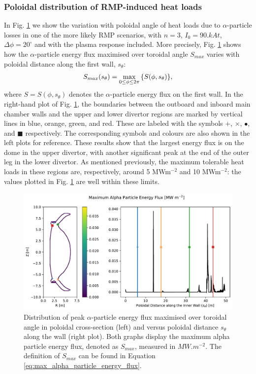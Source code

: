 \documentclass[10pt, a4paper, twoside]{article}
\begin{document}
\subsubsection{Poloidal distribution of RMP-induced heat loads}

In Fig. \ref{fig:energy_flux_distribution} we show the variation with poloidal angle of heat loads due to $\alpha$-particle losses in one of the more likely RMP scenarios, with $n=3$, $I_0= \si{90.kAt}$, $\Delta \phi = 20^\circ$ and with the plasma response included. More precisely, Fig. \ref{fig:energy_flux_distribution} shows how the $\alpha$-particle energy flux maximised over toroidal angle $S_{max}$ varies with poloidal distance along the first wall, $s_\theta$:
\begin{equation}
    \label{eq:max_alpha_particle_energy_flux}
    S_{max}(s_\theta) = \max_{0\le \phi \le 2\pi}\qty{S(\phi, s_\theta)},
\end{equation}
where $S=S(\phi, s_\theta)$ denotes the $\alpha$-particle energy flux on the first wall.
In the right-hand plot of Fig. \ref{fig:energy_flux_distribution}, the boundaries between the outboard and inboard main chamber walls and the upper and lower divertor regions are marked by vertical lines in blue, orange, green, and red. These are labeled with the symbols +, $\times$, $\bullet$, and $\blacksquare$ respectively. The corresponding symbols and colours are also shown in the left plots for reference. These results show that the largest energy flux is on the dome in the upper divertor, with another significant peak at the end of the outer leg in the lower divertor. As mentioned previously, the maximum tolerable heat loads in these regions are, respectively, around 5 MWm$^{-2}$ and 10 MWm$^{-2}$: the values plotted in Fig. \ref{fig:energy_flux_distribution} are well within these limits. 

\begin{figure}[htpb]
    \centering
    \includegraphics[width=0.99\linewidth]{Figures/energy_flux_distribution_rmp.pdf}
    \caption{Distribution of peak $\alpha$-particle energy flux maximised over toroidal angle in poloidal cross-section (left) and versus poloidal distance $s_\theta$ along the wall (right plot). Both graphs display the maximum alpha particle energy flux, denoted as $S_{max}$, measured in $\si{MW.m^{-2}}$. The definition of $S_{max}$ can be found in Equation \eqref{eq:max_alpha_particle_energy_flux}.}
    \label{fig:energy_flux_distribution}
\end{figure}
\end{document}
